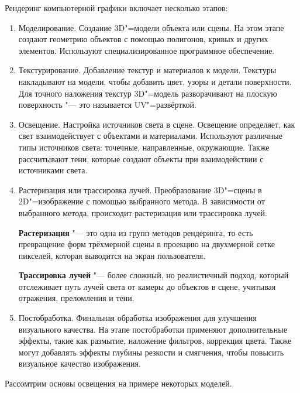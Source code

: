 Рендеринг компьютерной графики включает несколько этапов: 
\begin{enumerate}
    \item Моделирование. Создание 3D"=модели объекта или сцены. На этом этапе создают геометрию объектов с помощью полигонов, кривых и других элементов. Используют специализированное программное обеспечение.  
    \item Текстурирование. Добавление текстур и материалов к модели. Текстуры накладывают на модели, чтобы добавить цвет, узоры и детали поверхности. Для точного наложения текстур 3D"=модель разворачивают на плоскую поверхность "--- это называется UV"=развёрткой.
    \item Освещение. Настройка источников света в сцене.  Освещение определяет, как свет взаимодействует с объектами и материалами. Используют различные типы источников света: точечные, направленные, окружающие. Также рассчитывают тени, которые создают объекты при взаимодействии с источниками света.  
    \item Растеризация или трассировка лучей. Преобразование 3D"=сцены в 2D"=изображение с помощью выбранного метода. В зависимости от выбранного метода, происходит растеризация или трассировка лучей.  
    
    \textbf{Растеризация} "--- это одна из групп методов рендеринга, то есть превращение форм трёхмерной сцены в проекцию на двухмерной сетке пикселей, которая выводится на экран пользователя. 
    
    \textbf{Трассировка лучей} "--- более сложный, но реалистичный подход, который отслеживает путь лучей света от камеры до объектов в сцене, учитывая отражения, преломления и тени.
    \item Постобработка. Финальная обработка изображения для улучшения визуального качества.  На этапе постобработки применяют дополнительные эффекты, такие как размытие, наложение фильтров, коррекция цвета. Также могут добавлять эффекты глубины резкости и смягчения, чтобы повысить визуальное качество изображения.
\end{enumerate}

Рассомтрим основы освещения на примере некоторых моделей.

